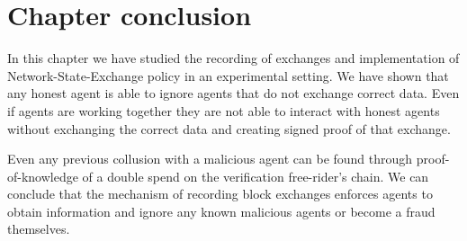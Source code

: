 \section{Chapter conclusion}
In this chapter we have studied the recording of exchanges and implementation of Network-State-Exchange
policy in an experimental setting. We have shown that any honest agent is able to ignore agents that
do not exchange correct data. Even if agents are working together they are not able to interact with
honest agents without exchanging the correct data and creating signed proof of that exchange. 

Even any previous collusion with a malicious agent can be found through proof-of-knowledge of a 
double spend on the verification free-rider's chain. We can conclude that the mechanism of recording
block exchanges enforces agents to obtain information and ignore any known malicious agents or 
become a fraud themselves.